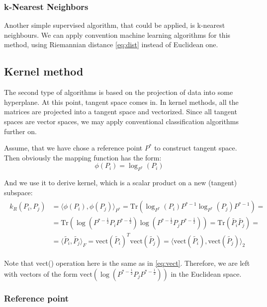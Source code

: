 \documentclass[12pt]{extarticle}
\theoremstyle{definition}
\theoremstyle{remark}
\begin{document}
	\subsubsection*{k-Nearest Neighbors}
	Another simple supervised algorithm, that could be applied, is k-nearest neighbours. We can apply convention machine learning algorithms for this method, using Riemannian distance \cref{eq:dist} instead of Euclidean one.
	
	\subsection{Kernel method}\label{sec:kernel}
	The second type of algorithms is based on the projection of data into some hyperplane. At this point, tangent space comes in. In kernel methods, all the matrices are projected into a tangent space and vectorized. Since all tangent spaces are vector spaces, we may apply conventional classification algorithms further on.
	
	Assume, that we have chose a reference point $P^*$ to construct tangent space. Then obviously the mapping function has the form:
	\begin{equation*}
	\phi (P_i) = \log_{P^*}(P_i)
	\end{equation*}
	
	And we use it to derive kernel, which is a scalar product on a new (tangent) subspace:
	\begin{align}\label{eq:kernel}
	\begin{split}
	k_R(P_i,P_j) &= \langle     \phi (P_i),     \phi (P_j)\rangle_{P^*} = \text{Tr}( \log_{P^*}(P_i)P^{*-1} \log_{P^*}(P_j)P^{*-1}) = \\
	&=    \text{Tr}( \log (P^{*-\frac12}P_i P^{*-\frac12}) \log (P^{*-\frac12}P_j P^{*-\frac12})) = \text{Tr}(\tilde{P_i}\tilde{P_j}) = \\
	&    = \langle \tilde{P_i},\tilde{P_j} \rangle_F =  \text{vect}(\tilde{P_i})^T  \text{vect}(\tilde{P_j}) =  \langle  \text{vect}(\tilde{P_i}), \text{vect}(\tilde{P_j}) \rangle_2
	\end{split}
	\end{align}
	
	Note that vect() operation here is the same as in \cref{eq:vect}. Therefore, we are left with vectors of the form $ \text{vect}\left(\log (P^{*-\frac12}P_j P^{*-\frac12})\right)$ in the Euclidean space. 
	
	\subsubsection*{Reference point}
	
\end{document}
